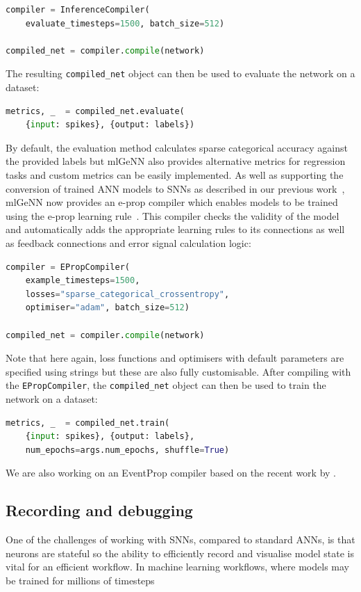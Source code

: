 \documentclass[sigconf]{acmart}
\begin{document}
\begin{lstlisting}[language=Python]
compiler = InferenceCompiler(
    evaluate_timesteps=1500, batch_size=512)

compiled_net = compiler.compile(network)
\end{lstlisting}

The resulting \lstinline{compiled_net} object can then be used to evaluate the network on a dataset:

\begin{lstlisting}[language=Python]
metrics, _  = compiled_net.evaluate(
    {input: spikes}, {output: labels})
\end{lstlisting}

By default, the evaluation method calculates sparse categorical accuracy against the provided labels but mlGeNN also provides alternative metrics for regression tasks and custom metrics can be easily implemented.
As well as supporting the conversion of trained ANN models to SNNs as described in our previous work~\citep{Turner2022}, mlGeNN now provides an e-prop compiler which enables models to be trained using the e-prop learning rule~\citep{Bellec2020}.
This compiler checks the validity of the model and automatically adds the appropriate learning rules to its connections as well as feedback connections and error signal calculation logic:

\begin{lstlisting}[language=Python]
compiler = EPropCompiler(
    example_timesteps=1500,
    losses="sparse_categorical_crossentropy",
    optimiser="adam", batch_size=512)

compiled_net = compiler.compile(network)
\end{lstlisting}
Note that here again, loss functions and optimisers with default parameters are specified using strings but these are also fully customisable.
After compiling with the \lstinline{EPropCompiler}, the \lstinline{compiled_net} object can then be used to train the network on a dataset:

\begin{lstlisting}[language=Python]
metrics, _  = compiled_net.train(
    {input: spikes}, {output: labels},
    num_epochs=args.num_epochs, shuffle=True)
\end{lstlisting}

We are also working on an EventProp compiler based on the recent work by \citet{NowotnyLoss2022}.

\subsection{Recording and debugging}
One of the challenges of working with SNNs, compared to standard ANNs, is that neurons are stateful so the ability to efficiently record and visualise model state is vital for an efficient workflow.
In machine learning workflows, where models may be trained for millions of timesteps 
\end{document}
